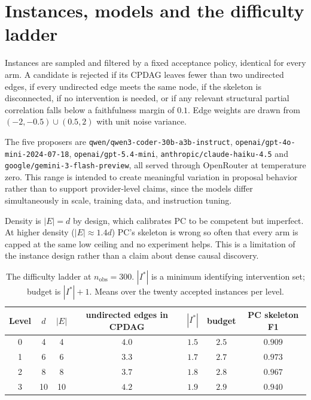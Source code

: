 \documentclass{article}
\begin{document}
\section{Instances, models and the difficulty ladder}
\label{app:instances}

Instances are sampled and filtered by a fixed acceptance policy, identical for every arm. A
candidate is rejected if its CPDAG leaves fewer than two undirected edges, if every undirected edge
meets the same node, if the skeleton is disconnected, if no intervention is needed, or if any
relevant structural partial correlation falls below a faithfulness margin of $0.1$. Edge weights
are drawn from $(-2,-0.5) \cup (0.5,2)$ with unit noise variance.

The five proposers are \texttt{qwen/qwen3-coder-30b-a3b-instruct},
\texttt{openai/gpt-4o-mini-2024-07-18}, \texttt{openai/gpt-5.4-mini},
\texttt{anthropic/claude-haiku-4.5} and \texttt{google/gemini-3-flash-preview}, all served through
OpenRouter at temperature zero. This range is intended to create meaningful variation in proposal
behavior rather than to support provider-level claims, since the models differ simultaneously in
scale, training data, and instruction tuning.

Density is $|E| = d$ by design, which calibrates PC to be competent but imperfect. At higher
density ($|E| \approx 1.4d$) PC's skeleton is wrong so often that every arm is capped at the same
low ceiling and no experiment helps. This is a limitation of the instance design rather than a
claim about dense causal discovery.

\begin{table}[h]
\caption{The difficulty ladder at $n_{\mathrm{obs}}{=}300$. $|I^*|$ is a minimum identifying
intervention set; budget is $|I^*| + 1$. Means over the twenty accepted instances per level.}
\label{tab:levels}
\centering
\small
\begin{tabular}{ccccccc}
\toprule
Level & $d$ & $|E|$ & undirected edges in CPDAG & $|I^*|$ & budget & PC skeleton F1 \\
\midrule
0 & 4  & 4  & $4.0$ & $1.5$ & $2.5$ & $0.909$ \\
1 & 6  & 6  & $3.3$ & $1.7$ & $2.7$ & $0.973$ \\
2 & 8  & 8  & $3.7$ & $1.8$ & $2.8$ & $0.967$ \\
3 & 10 & 10 & $4.2$ & $1.9$ & $2.9$ & $0.940$ \\
\bottomrule
\end{tabular}
\end{table}
\end{document}
